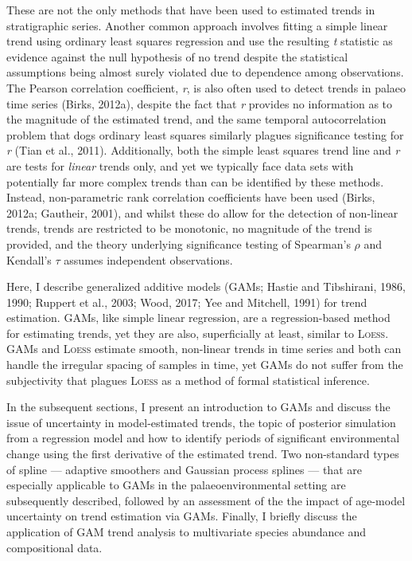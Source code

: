 \documentclass[12pt,]{article}
\newcommand{\loess}{\textsc{Loess}}
\begin{document}
These are not the only methods that have been used to estimated trends
in stratigraphic series. Another common approach involves fitting a
simple linear trend using ordinary least squares regression and use the
resulting \emph{t} statistic as evidence against the null hypothesis of
no trend despite the statistical assumptions being almost surely
violated due to dependence among observations. The Pearson correlation
coefficient, \emph{r}, is also often used to detect trends in palaeo
time series (Birks, 2012a), despite the fact that \emph{r} provides no
information as to the magnitude of the estimated trend, and the same
temporal autocorrelation problem that dogs ordinary least squares
similarly plagues significance testing for \emph{r} (Tian et al., 2011).
Additionally, both the simple least squares trend line and \emph{r} are
tests for \emph{linear} trends only, and yet we typically face data sets
with potentially far more complex trends than can be identified by these
methods. Instead, non-parametric rank correlation coefficients have been
used (Birks, 2012a; Gautheir, 2001), and whilst these do allow for the
detection of non-linear trends, trends are restricted to be monotonic,
no magnitude of the trend is provided, and the theory underlying
significance testing of Spearman's \(\rho\) and Kendall's \(\tau\)
assumes independent observations.

Here, I describe generalized additive models (GAMs; Hastie and
Tibshirani, 1986, 1990; Ruppert et al., 2003; Wood, 2017; Yee and
Mitchell, 1991) for trend estimation. GAMs, like simple linear
regression, are a regression-based method for estimating trends, yet
they are also, superficially at least, similar to \loess{}. GAMs and
\loess{} estimate smooth, non-linear trends in time series and both can
handle the irregular spacing of samples in time, yet GAMs do not suffer
from the subjectivity that plagues \loess{} as a method of formal
statistical inference.

In the subsequent sections, I present an introduction to GAMs and
discuss the issue of uncertainty in model-estimated trends, the topic of
posterior simulation from a regression model and how to identify periods
of significant environmental change using the first derivative of the
estimated trend. Two non-standard types of spline --- adaptive smoothers
and Gaussian process splines --- that are especially applicable to GAMs
in the palaeoenvironmental setting are subsequently described, followed
by an assessment of the the impact of age-model uncertainty on trend
estimation via GAMs. Finally, I briefly discuss the application of GAM
trend analysis to multivariate species abundance and compositional data.
\end{document}
